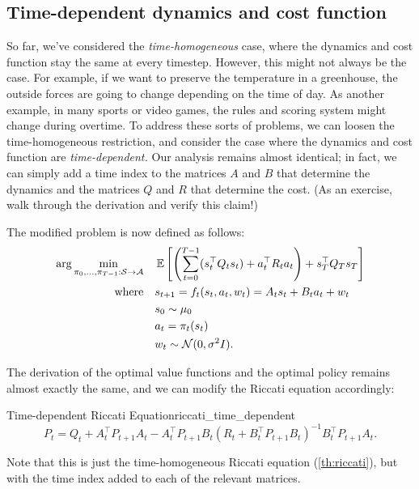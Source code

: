 \documentclass[../main/main]{subfiles}
\begin{document}
\subsection[Time-dependency]{Time-dependent dynamics and cost function} \label{sec:time_dep_lqr}

So far, we've considered the \emph{time-homogeneous} case, where the dynamics and cost function stay the same at every timestep. However, this might not always be the case. For example, if we want to preserve the temperature in a greenhouse, the outside forces are going to change depending on the time of day.
As another example, in many sports or video games, the rules and scoring system might change during overtime.
To address these sorts of problems, we can loosen the time-homogeneous restriction, and consider the case where the dynamics and cost function are \emph{time-dependent.}
Our analysis remains almost identical; in fact, we can simply add a time index to the matrices $A$ and $B$ that determine the dynamics and the matrices $Q$ and $R$ that determine the cost. (As an exercise, walk through the derivation and verify this claim!)

The modified problem is now defined as follows:
\begin{align*}
    \arg \min_{\pi_{0}, \dots, \pi_{T-1} : \mathcal{S} \to \mathcal{A}} \quad & \operatorname*{\mathbb{E}} \left[ \left( \sum_{t=0}^{T-1} (s_t^\top Q_t s_t) + a_t^\top R_t a_t \right) + s_T^\top Q_T s_T \right] \\
    \textrm{where} \quad & s_{t+1} = f_t(s_t, a_t, w_t) = A_t s_t + B_t a_t + w_t \\
    & s_0 \sim \mu_0 \\
    & a_t = \pi_t (s_t) \\
    & w_t \sim \mathcal{N}(0, \sigma^2 I).
\end{align*}

The derivation of the optimal value functions and the optimal policy remains almost exactly the same,
and we can modify the Riccati equation accordingly:

\begin{theorem}{Time-dependent Riccati Equation}{riccati_time_dependent}
    \[
        P_t = Q_t + A_t^\top P_{t+1} A_t - A_t^\top P_{t+1} B_t (R_t + B_t^\top P_{t+1} B_t)^{-1} B_t^\top P_{t+1} A_t.
    \]

    \noindent
    Note that this is just the time-homogeneous Riccati equation (\autoref{th:riccati}), but with the
    time index added to each of the relevant matrices.
\end{theorem}
\end{document}
